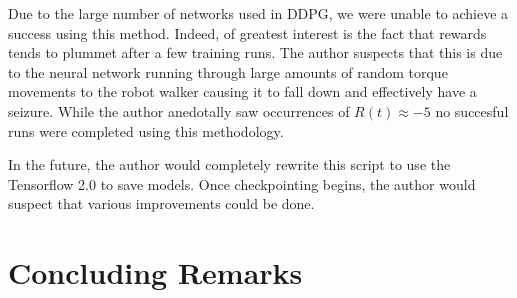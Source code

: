 \documentclass[man, 12pt]{apa6}
\begin{document}
Due to the large number of networks used in DDPG, we were unable to achieve a success using this method. Indeed, of greatest interest is the fact that rewards tends to plummet after a few training runs. The author suspects that this is due to the neural network running through large amounts of  random torque movements to the robot walker causing it to fall down and effectively have a seizure. While the author anedotally saw occurrences of $R(t) \approx -5$ no succesful runs were completed using this methodology. 

In the future, the author would completely rewrite this script to use the Tensorflow 2.0 to save models. Once checkpointing begins, the author would suspect that various improvements could be done. 


\newpage
\section{Concluding Remarks}



\cite{*}

\end{document}
